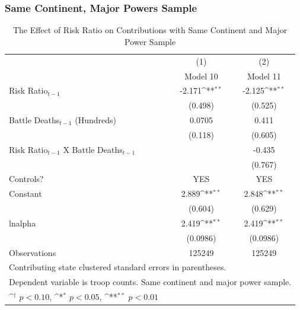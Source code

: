 \documentclass{beamer}
\begin{document}

\begin{frame}[fragile]
\frametitle{Same Continent, Major Powers Sample}

\begin{table}[htbp]\centering
\tiny
\def\sym#1{\ifmmode^{#1}\else\(^{#1}\)\fi}
\caption{The Effect of Risk Ratio on Contributions with Same Continent and Major Power Sample \label{Table 7}}
\vspace{0.4cm}
\begin{tabular}{l*{2}{c}}
\hline\hline
                    &\multicolumn{1}{c}{(1)}        &\multicolumn{1}{c}{(2)}        \\
                    &          Model 10        &         Model 11        \\
\hline
Risk Ratio$_{t-1}$          &      -2.171\sym{**}&      -2.125\sym{**}\\
                    &     (0.498)        &     (0.525)        \\
[1em]
Battle Deaths$_{t-1}$ (Hundreds)&      0.0705        &       0.411        \\
                    &     (0.118)        &     (0.605)        \\
[1em]
Risk Ratio$_{t-1}$ X Battle Deaths$_{t-1}$ &                    &      -0.435        \\
                    &                    &     (0.767)        \\
Controls?           &         YES        &        YES         \\
[1em]
Constant            &       2.889\sym{**}&       2.848\sym{**}\\
                    &     (0.604)        &     (0.629)        \\
\hline
lnalpha             &       2.419\sym{**}&       2.419\sym{**}\\
                    &    (0.0986)        &    (0.0986)        \\
\hline
Observations        &      125249        &      125249        \\
\hline\hline
\multicolumn{3}{l}{\tiny Contributing state clustered standard errors in parentheses.}\\
\multicolumn{3}{l}{\tiny Dependent variable is troop counts. Same continent and major power sample.}\\
\multicolumn{3}{l}{\tiny \sym{\dagger} \(p<0.10\), \sym{*} \(p<0.05\), \sym{**} \(p<0.01\)}\\
\end{tabular}
\end{table}

\end{frame}
\end{document}
